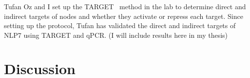 \documentclass[../main.tex]{subfiles}
\begin{document}
Tufan Oz and I set up the TARGET~\autocite{bargmannTARGETTransientTransformation2013} method in the lab to determine direct and indirect targets of nodes and whether they activate or repress each target.
Since setting up the protocol, Tufan has validated the direct and indirect targets of NLP7 using TARGET and qPCR.
(I will include results here in my thesis)

\section{Discussion}\label{chapter4:discussion}
\end{document}
